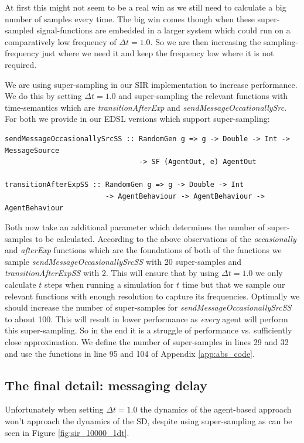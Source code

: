 At first this might not seem to be a real win as we still need to calculate a big number of samples every time. The big win comes though when these super-sampled signal-functions are embedded in a larger system which could run on a comparatively low frequency of $\Delta t = 1.0$. So we are then increasing the sampling-frequency just where we need it and keep the frequency low where it is not required.

We are using super-sampling in our SIR implementation to increase performance. We do this by setting $\Delta t = 1.0$ and super-sampling the relevant functions with time-semantics which are \textit{transitionAfterExp} and \textit{sendMessageOccationallySrc}. For both we provide in our EDSL versions which support super-sampling:

\begin{verbatim}
sendMessageOccasionallySrcSS :: RandomGen g => g -> Double -> Int -> MessageSource 
                                -> SF (AgentOut, e) AgentOut
                                
transitionAfterExpSS :: RandomGen g => g -> Double -> Int 
                        -> AgentBehaviour -> AgentBehaviour -> AgentBehaviour
\end{verbatim}

Both now take an additional parameter which determines the number of super-samples to be calculated. According to the above observations of the \textit{occasionally} and \textit{afterExp} functions which are the foundations of both of the functions we sample \textit{sendMessageOccasionallySrcSS} with 20 super-samples and \textit{transitionAfterExpSS} with 2. This will ensure that by using $\Delta t = 1.0$ we only calculate $t$ steps when running a simulation for $t$ time but that we sample our relevant functions with enough resolution to capture its frequencies. Optimally we should increase the number of super-samples for \textit{sendMessageOccasionallySrcSS} to about 100. This will result in lower performance as \textit{every} agent will perform this super-sampling. So in the end it is a struggle of performance vs. sufficiently close approximation. We define the number of super-samples in lines 29 and 32 and use the functions in line 95 and 104 of Appendix \ref{app:abs_code}.

\subsection{The final detail: messaging delay}
Unfortunately when setting $\Delta t = 1.0$ the dynamics of the agent-based approach won't approach the dynamics of the SD, despite using super-sampling as can be seen in Figure \ref{fig:sir_10000_1dt}.

